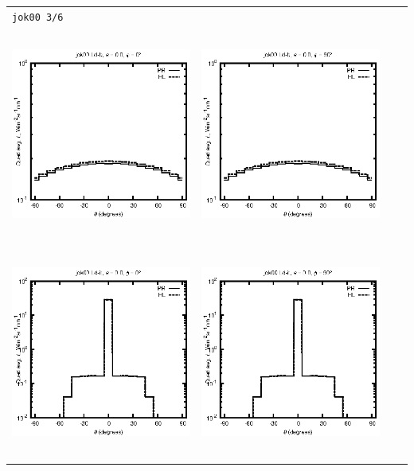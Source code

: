 \begin{tabular}{c c c c}
\multicolumn{4}{l}{\texttt{jok00 3/6}} \\
\includegraphics[height=7cm]{../eps/jok00_Ld_b_fwd.eps} &
\includegraphics[height=7cm]{../eps/jok00_Ld_b_cross.eps} \\
\includegraphics[height=7cm]{../eps/jok00_Ld_it_fwd.eps} &
\includegraphics[height=7cm]{../eps/jok00_Ld_it_cross.eps} \\

\end{tabular}
